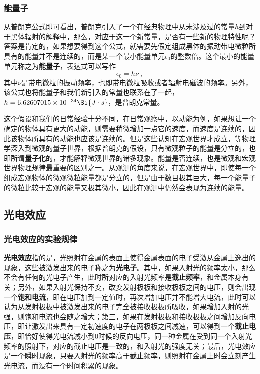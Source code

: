 \subsubsection{能量子}
从普朗克公式即可看出，普朗克引入了一个在经典物理中从未涉及过的常量$h$到对于黑体辐射的解释中，那么，对应于这一个新常量，是否有一些新的物理特性呢？答案是肯定的，如果想要得到这个公式，就需要先假定组成黑体的振动带电微粒所具有的能量并不是连续的，而是某一个最小能量单元$\epsilon_0$的整数倍。这个最小的能量单元称之为\textbf{能量子}，表达式可以写作$$\epsilon_0=h\nu ~,$$其中$\nu$是带电微粒的振动频率，也即带电微粒吸收或者辐射电磁波的频率。另外，该公式也将能量子和我们新引入的常量也联系在了一起，$h=6.62607015\times 10^{-34}\Si{J\cdot s}$，是普朗克常量。

这个假设和我们的日常经验十分不同，在日常观察中，以动能为例，如果想让一个确定的物体具有更大的动能，则需要稍微增加一点它的速度，而速度是连续的，因此该物体所具有的动能也应该是连续的。但是这些认知在宏观世界才成立，等物理学深入到微观的量子世界，根据普朗克的假设，只有微观粒子的能量是分立的，也即所谓\textbf{量子化}的，才能解释微观世界的诸多现象。能量是否连续，也是微观和宏观世界物理规律最重要的区别之一。从观测的角度来说，在宏观世界中，即使每一个组成宏观物体的微观微粒能量都是分立的，但是由于数目极其巨大，每一个能量子的微粒比较于宏观的能量又极其微小，因此在观测中仍然会表现为连续的能量。

\subsection{光电效应}
\subsubsection{光电效应的实验规律}
\textbf{光电效应}指的是，光照射在金属的表面上使得金属表面的电子受激从金属上逸出的现象，这些被激发出来的电子称之为\textbf{光电子}。其中，如果入射光的频率太小，那么不会有任何的光电子产生，此时所对应的入射光频率是\textbf{截止频率}，和金属本身有关；另外，如果入射光保持不变，改变发射极板和接收极板之间的电压，则会出现一个\textbf{饱和电流}，即在电压加到一定值时，再次增加电压并不能增大电流，此时可以认为从发射极板中被激发出来的电子完全被接收极板所吸收，如果增加入射的光强，则饱和电流也会随之增大；第三，如果在发射极板和接收极板之间增加反向电压，即让激发出来具有一定初速度的电子在两极板之间减速，可以得到一个\textbf{截止电压}，即恰好使得光电流减小到$0$时候的反向电压，同一种金属在受到同一个入射光频率的照射下，对应的截止电压是一致的，和入射光的强度无关；最后，光电效应是一个瞬时现象，只要入射光的频率高于截止频率，则照射在金属上时会立刻产生光电流，而没有一个时间积累的现象。

